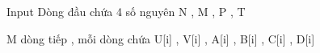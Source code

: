 Input
Dòng đầu chứa 4 số nguyên N , M , P , T

M dòng tiếp , mỗi dòng chứa U[i] , V[i] , A[i] , B[i] , C[i] , D[i]